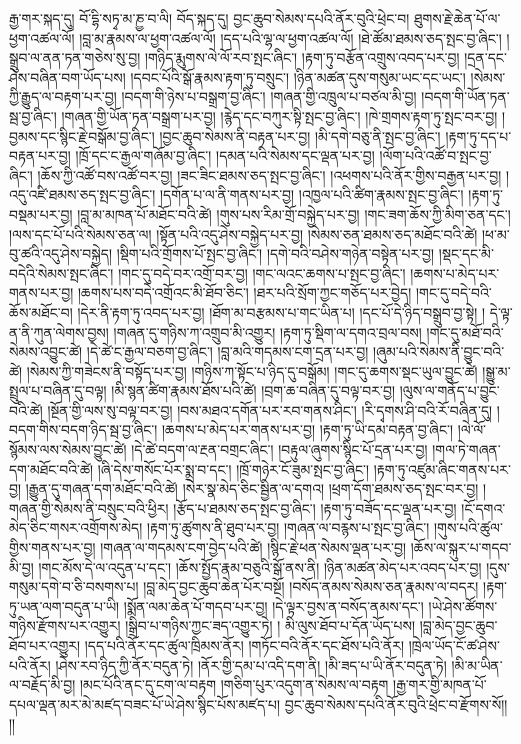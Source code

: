 རྒྱ་གར་སྐད་དུ། བོ་དྷི་སཏྭ་མ་ཎྱ་བ་ལི། བོད་སྐད་དུ། བྱང་ཆུབ་སེམས་དཔའི་ནོར་བུའི་ཕྲེང་བ། ཐུགས་རྗེ་ཆེན་པོ་ལ་ཕྱག་འཚལ་ལོ། །བླ་མ་རྣམས་ལ་ཕྱག་འཚལ་ལོ། །དད་པའི་ལྷ་ལ་ཕྱག་འཚལ་ལོ། །ཐེ་ཚོམ་ཐམས་ཅད་སྤང་བྱ་ཞིང་། །སྒྲུབ་ལ་ནན་ཏན་གཅེས་སུ་བྱ། །གཉིད་རྨུགས་ལེ་ལོ་རབ་སྤང་ཞིང་། །རྟག་ཏུ་བརྩོན་འགྲུས་འབད་པར་བྱ། །དྲན་དང་ཤེས་བཞིན་བག་ཡོད་པས། །དབང་པོའི་སྒོ་རྣམས་རྟག་ཏུ་བསྲུང་། །ཉིན་མཚན་དུས་གསུམ་ཡང་དང་ཡང་། །སེམས་ཀྱི་རྒྱུད་ལ་བརྟག་པར་བྱ། །བདག་གི་ཉེས་པ་བསྒྲག་བྱ་ཞིང་། །གཞན་གྱི་འཁྲུལ་པ་བཙལ་མི་བྱ། །བདག་གི་ཡོན་ཏན་སྦ་བྱ་ཞིང་། །གཞན་གྱི་ཡོན་ཏན་བསྒྲག་པར་བྱ། །རྙེད་དང་བཀུར་སྟི་སྤང་བྱ་ཞིང་། །ཁེ་གྲགས་རྟག་ཏུ་སྤང་བར་བྱ། །བྱམས་དང་སྙིང་རྗེ་བསྒོམ་བྱ་ཞིང་། །བྱང་ཆུབ་སེམས་ནི་བརྟན་པར་བྱ། །མི་དགེ་བཅུ་ནི་སྤང་བྱ་ཞིང་། །རྟག་ཏུ་དད་པ་བརྟན་པར་བྱ། །ཁྲོ་དང་ང་རྒྱལ་གཞོམ་བྱ་ཞིང་། །དམན་པའི་སེམས་དང་ལྡན་པར་བྱ། །ལོག་པའི་འཚོ་བ་སྤང་བྱ་ཞིང་། །ཆོས་ཀྱི་འཚོ་བས་འཚོ་བར་བྱ། །ཟང་ཟིང་ཐམས་ཅད་སྤང་བྱ་ཞིང་། །འཕགས་པའི་ནོར་གྱིས་བརྒྱན་པར་བྱ། །འདུ་འཛི་ཐམས་ཅད་སྤང་བྱ་ཞིང་། །དགོན་པ་ལ་ནི་གནས་པར་བྱ། །འཁྱལ་པའི་ཚིག་རྣམས་སྤང་བྱ་ཞིང་། །རྟག་ཏུ་བསྡམ་པར་བྱ། །བླ་མ་མཁན་པོ་མཐོང་བའི་ཚེ། །གུས་པས་རིམ་གྲོ་བསྐྱེད་པར་བྱ། །གང་ཟག་ཆོས་ཀྱི་མིག་ཅན་དང་། །ལས་དང་པོ་པའི་སེམས་ཅན་ལ། །སྟོན་པའི་འདུ་ཤེས་བསྐྱེད་པར་བྱ། །སེམས་ཅན་ཐམས་ཅད་མཐོང་བའི་ཚེ། །ཕ་མ་བུ་ཚའི་འདུ་ཤེས་བསྐྱེད། །སྡིག་པའི་གྲོགས་པོ་སྤང་བྱ་ཞིང་། །དགེ་བའི་བཤེས་གཉེན་བསྟེན་པར་བྱ། །སྡང་དང་མི་བདེའི་སེམས་སྤང་ཞིང་། །གང་དུ་བདེ་བར་འགྲོ་བར་བྱ། །གང་ལའང་ཆགས་པ་སྤང་བྱ་ཞིང་། །ཆགས་པ་མེད་པར་གནས་པར་བྱ། །ཆགས་པས་བདེ་འགྲོའང་མི་ཐོབ་ཅིང་། །ཐར་པའི་སྲོག་ཀྱང་གཅོད་པར་བྱེད། །གང་དུ་བདེ་བའི་ཆོས་མཐོང་བ། །དེར་ནི་རྟག་ཏུ་འབད་པར་བྱ། །ཐོག་མ་བརྩམས་པ་གང་ཡིན་པ། །དང་པོ་དེ་ཉིད་བསྒྲུབ་བྱ་སྟེ། །
དེ་ལྟ་ན་ནི་ཀུན་ལེགས་བྱས། །གཞན་དུ་གཉིས་ཀ་འགྲུབ་མི་འགྱུར། །རྟག་ཏུ་སྡིག་ལ་དགའ་བྲལ་བས། །གང་དུ་མཐོ་བའི་སེམས་འབྱུང་ཚེ། །དེ་ཚེ་ང་རྒྱལ་བཅག་བྱ་ཞིང་། །བླ་མའི་གདམས་ངག་དྲན་པར་བྱ། །ཞུམ་པའི་སེམས་ནི་བྱུང་བའི་ཚེ། །སེམས་ཀྱི་གཟེངས་ནི་བསྟོད་པར་བྱ། །གཉིས་ཀ་སྟོང་པ་ཉིད་དུ་བསྒོམ། །གང་དུ་ཆགས་སྡང་ཡུལ་བྱུང་ཚེ། །སྒྱུ་མ་སྤྲུལ་པ་བཞིན་དུ་བལྟ། །མི་སྙན་ཚིག་རྣམས་ཐོས་པའི་ཚེ། །བྲག་ཆ་བཞིན་དུ་བལྟ་བར་བྱ། །ལུས་ལ་གནོད་པ་བྱུང་བའི་ཚེ། །སྔོན་གྱི་ལས་སུ་བལྟ་བར་བྱ། །བས་མཐའ་དགོན་པར་རབ་གནས་ཤིང་། །རི་དྭགས་ཤི་བའི་རོ་བཞིན་དུ། །བདག་གིས་བདག་ཉིད་སྦ་བྱ་ཞིང་། །ཆགས་པ་མེད་པར་གནས་པར་བྱ། །རྟག་ཏུ་ཡི་དམ་བརྟན་བྱ་ཞིང་། །ལེ་ལོ་སྙོམས་ལས་སེམས་བྱུང་ཚེ། །དེ་ཚེ་བདག་ལ་རྔན་བགྲང་ཞིང་། །བརྟུལ་ཞུགས་སྙིང་པོ་དྲན་པར་བྱ། །གལ་ཏེ་གཞན་དག་མཐོང་བའི་ཚེ། །ཞི་དེས་གསོང་པོར་སྨྲ་བ་དང་། །ཁྲོ་གཉེར་ངོ་ཟུམ་སྤང་བྱ་ཞིང་། །རྟག་ཏུ་འཛུམ་ཞིང་གནས་པར་བྱ། །རྒྱུན་དུ་གཞན་དག་མཐོང་བའི་ཚེ། །སེར་སྣ་མེད་ཅིང་སྦྱིན་ལ་དགའ། །ཕྲག་དོག་ཐམས་ཅད་སྤང་བར་བྱ། །གཞན་གྱི་སེམས་ནི་བསྲུང་བའི་ཕྱིར། །རྩོད་པ་ཐམས་ཅད་སྤང་བྱ་ཞིང་། །རྟག་ཏུ་བཟོད་དང་ལྡན་པར་བྱ། །ངོ་དགའ་མེད་ཅིང་གསར་འགྲོགས་མེད། །རྟག་ཏུ་ཚུགས་ནི་ཐུབ་པར་བྱ། །གཞན་ལ་བརྙས་པ་སྤང་བྱ་ཞིང་། །གུས་པའི་ཚུལ་གྱིས་གནས་པར་བྱ། །གཞན་ལ་གདམས་ངག་བྱེད་པའི་ཚེ། །སྙིང་རྗེ་ཕན་སེམས་ལྡན་པར་བྱ། །ཆོས་ལ་སྐུར་པ་གདབ་མི་བྱ། །གང་མོས་དེ་ལ་འདུན་པ་དང་། །ཆོས་སྤྱོད་རྣམ་བཅུའི་སྒོ་ནས་ནི། །ཉིན་མཚན་མེད་པར་འབད་པར་བྱ། །དུས་གསུམ་དགེ་བ་ཅི་བསགས་པ། །བླ་མེད་བྱང་ཆུབ་ཆེན་པོར་བསྔོ། །བསོད་ནམས་སེམས་ཅན་རྣམས་ལ་བདར། །རྟག་ཏུ་ཡན་ལག་བདུན་པ་ཡི། །སྨོན་ལམ་ཆེན་པོ་གདབ་པར་བྱ། །དེ་ལྟར་བྱས་ན་བསོད་ནམས་དང་། །ཡེ་ཤེས་ཚོགས་གཉིས་རྫོགས་པར་འགྱུར། །སྒྲིབ་པ་གཉིས་ཀྱང་ཟད་འགྱུར་ཏེ། །
མི་ལུས་ཐོབ་པ་དོན་ཡོད་པས། །བླ་མེད་བྱང་ཆུབ་ཐོབ་པར་འགྱུར། །དད་པའི་ནོར་དང་ཚུལ་ཁྲིམས་ནོར། །གཏོང་བའི་ནོར་དང་ཐོས་པའི་ནོར། །ཁྲེལ་ཡོད་ངོ་ཚ་ཤེས་པའི་ནོར། །ཤེས་རབ་ཉིད་ཀྱི་ནོར་བདུན་ཏེ། །ནོར་གྱི་དམ་པ་འདི་དག་ནི། །མི་ཟད་པ་ཡི་ནོར་བདུན་ཏེ། །མི་མ་ཡིན་ལ་བརྗོད་མི་བྱ། །མང་པོའི་ནང་དུ་ངག་ལ་བརྟག །གཅིག་པུར་འདུག་ན་སེམས་ལ་བརྟག །རྒྱ་གར་གྱི་མཁན་པོ་དཔལ་ལྡན་མར་མེ་མཛད་བཟང་པོ་ཡེ་ཤེས་སྙིང་པོས་མཛད་པ། བྱང་ཆུབ་སེམས་དཔའི་ནོར་བུའི་ཕྲེང་བ་རྫོགས་སོ།། །།